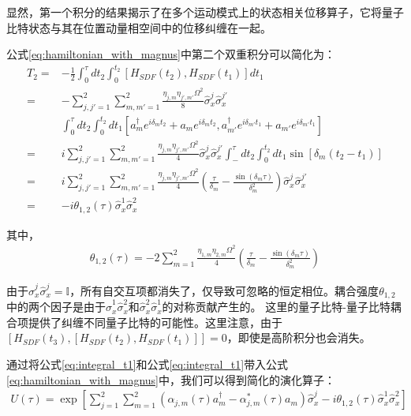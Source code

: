显然，第一个积分的结果揭示了在多个运动模式上的状态相关位移算子，它将量子比特状态与其在位置动量相空间中的位移纠缠在一起。

公式\eqref{eq:hamiltonian_with_magnus}中第二个双重积分可以简化为：
\begin{align}
    T_2=&-\frac{1}{2}\int_{0}^{\tau}dt_2\int_{0}^{t_2}[H_{SDF}(t_2),H_{SDF}(t_1)]dt_1\\
    =&-\sum_{j,j'=1}^{2}\sum_{m,m'=1}^{2}\frac{\eta_{j,m}\eta_{j',m'}\Omega^2}{8}\hat{\sigma}_x^j\hat{\sigma}_x^{j'}\\
    &\int_{0}^{\tau}dt_2\int_{0}^{t_2}dt_1\left[a_m^\dagger e^{i\delta_m t_2}+a_m e^{i\delta_m t_2}, a_{m'}^\dagger e^{i\delta_{m'} t_1}+a_{m'} e^{i\delta_{m'} t_1}\right]\\
    =&i\sum_{j,j'=1}^{2}\sum_{m,m'=1}^{2}\frac{\eta_{j,m}\eta_{j',m'}\Omega^2}{4}\hat{\sigma}_x^j\hat{\sigma}_x^{j'}\int_{-}^{\tau}dt_2\int_{0}^{t_2}dt_1\sin[\delta_m(t_2-t_1)]\\
    =&i\sum_{j,j'=1}^{2}\sum_{m,m'=1}^{2}\frac{\eta_{j,m}\eta_{j',m'}\Omega^2}{4}\left(\frac{\tau}{\delta_m}-\frac{\sin(\delta_m\tau)}{\delta_m^2}\right)\hat{\sigma}_x^j\hat{\sigma}_x^{j'}\\
    =&-i\theta_{1,2}(\tau)\hat{\sigma}_x^1\hat{\sigma}_x^2\label{eq:integral_t2}
\end{align}

其中，
\begin{align}
    \theta_{1,2}(\tau)=-2\sum_{m=1}^{2}\frac{\eta_{1,m}\eta_{2,m}\Omega^2}{4}\left(\frac{\tau}{\delta_m}-\frac{\sin(\delta_m\tau)}{\delta_m^2}\right)
\end{align}

由于$\hat{\sigma}_x^j\hat{\sigma}_x^j=\mathbb{I}$，所有自交互项都消失了，仅导致可忽略的恒定相位。耦合强度$\theta_{1,2}$中的两个因子是由于$\hat{\sigma}_x^1\hat{\sigma}_x^2$和$\hat{\sigma}_x^2\hat{\sigma}_x^1$的对称贡献产生的。
这里的量子比特-量子比特耦合项提供了纠缠不同量子比特的可能性。这里注意，由于$[H_{SDF}(t_3),[H_{SDF}(t_2),H_{SDF}(t_1)]]=0$，即使是高阶积分也会消失。

通过将公式\eqref{eq:integral_t1}和公式\eqref{eq:integral_t1}带入公式\eqref{eq:hamiltonian_with_magnus}中，我们可以得到简化的演化算子：
\begin{align}
    U(\tau)=\exp\left[\sum_{j=1}^{2}\sum_{m=1}^{2}\left(\alpha_{j,m}(\tau)a_m^\dagger-\alpha_{j,m}^*(\tau)a_m\right)\hat{\sigma}_x^j-i\theta_{1,2}(\tau)\hat{\sigma}_x^1\hat{\sigma}_x^2\right]
\end{align}

